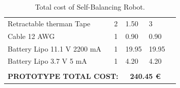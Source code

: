 \begin{table}[H]
{\begin{turn}{90}
\begin{tabular}{|l|l|l|l|l}
		Retractable therman Tape                                    & 2                                         & 1.50                                                                                                                & 3                                                                                                                &  \\ \cline{1-4}
		Cable 12 AWG                                           & 1                                         & 0.90                                                                                                                & 0.90                                                                                                             &  \\ \cline{1-4}
		Battery Lipo 11.1 V 2200 mA                                     & 1                                         & 19.95                                                                                                               & 19.95                                                                                                            &  \\ \cline{1-4}
		Battery Lipo 3.7 V 5 mA                                         & 1                                         & 4.20                                                                                                                & 4.20                                                                                                             &  \\ \cline{1-4}
		\multicolumn{2}{|c|}{}                                                                                      & \multicolumn{2}{c|}{\cellcolor[HTML]{FD6864}}                                                                                                                                                                                          &  \\
		\multicolumn{2}{|c|}{\multirow{-2}{*}{\textbf{PROTOTYPE TOTAL COST:}}}                                     & \multicolumn{2}{c|}{\multirow{-2}{*}{\cellcolor[HTML]{FD6864}\textbf{240.45 \euro}}}                                                                                                                                                         &  \\ \cline{1-4}
	\end{tabular}
	\end{turn}}
	\caption{Total cost of Self-Balancing Robot.}
	\label{tabla:coste}
\end{table}
\newpage
